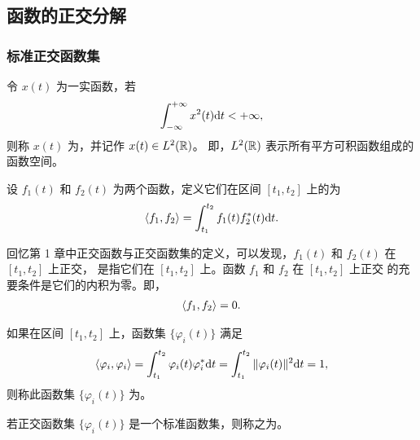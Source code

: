 \subsection{函数的正交分解}

\subsubsection{标准正交函数集}

\begin{definition}[平方可积函数]
    令 $x(t)$ 为一实函数，若
    \begin{align*}
        \int_{-\infty}^{+\infty}x^2(t)\mathrm{d}t < +\infty,
    \end{align*}
    则称 $x(t)$ 为，并记作 $x(t) \in L^2(\mathbb{R})$。
    即，$L^2(\mathbb{R})$ 表示所有平方可积函数组成的函数空间。
\end{definition}

\begin{definition}[内积]
    设 $f_1(t)$ 和 $f_2(t)$ 为两个函数，定义它们在区间 $[t_1, t_2]$ 上的为
    \begin{align*}
        \left\langle f_1, f_2\right\rangle = \int_{t_1}^{t_2}f_1(t)f_2^*(t)\mathrm{d}t.
    \end{align*}
\end{definition}

\begin{remark}
    回忆第 1 章中正交函数与正交函数集的定义，可以发现，$f_1(t)$ 和 $f_2(t)$ 在 $[t_1, t_2]$ 上正交，
    是指它们在 $[t_1, t_2]$ 上。函数 $f_1$ 和 $f_2$ 在 $[t_1, t_2]$ 上正交
    的充要条件是它们的内积为零。即，
    \begin{align*}
        \left\langle f_1, f_2\right\rangle = 0.
    \end{align*}
\end{remark}

\begin{definition}[标准函数集]
    如果在区间 $[t_1, t_2]$ 上，函数集 $\{\varphi_i(t)\}$ 满足
    \begin{align*}
        \left\langle\varphi_i, \varphi_i\right\rangle = \int_{t_1}^{t_2}\varphi_i(t)\varphi_i^*\mathrm{d}t
            = \int_{t_1}^{t_2}\|\varphi_i(t)\|^2\mathrm{d}t = 1,
    \end{align*}
    则称此函数集 $\{\varphi_i(t)\}$ 为。
\end{definition}

\begin{definition}[标准正交函数集]
    若正交函数集 $\{\varphi_i(t)\}$ 是一个标准函数集，则称之为。
\end{definition}


